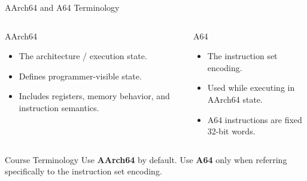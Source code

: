 \documentclass[aspectratio=169,11pt,t]{beamer}
\newcommand{\key}[1]{\textbf{#1}}
\begin{document}
\begin{frame}{AArch64 and A64 Terminology}

\begin{columns}[T,onlytextwidth]


\begin{block}{AArch64}
\begin{itemize}
  \item The architecture / execution state.
  \item Defines programmer-visible state.
  \item Includes registers,
        memory behavior,
        and instruction semantics.
\end{itemize}
\end{block}


\begin{block}{A64}
\begin{itemize}
  \item The instruction set encoding.
  \item Used while executing
        in AArch64 state.
  \item A64 instructions
        are fixed 32-bit words.
\end{itemize}
\end{block}

\end{columns}

\vspace{0.15cm}

\begin{block}{Course Terminology}
Use \key{AArch64} by default.
Use \key{A64}
only when referring specifically
to the instruction set encoding.
\end{block}

\end{frame}



\end{document}
